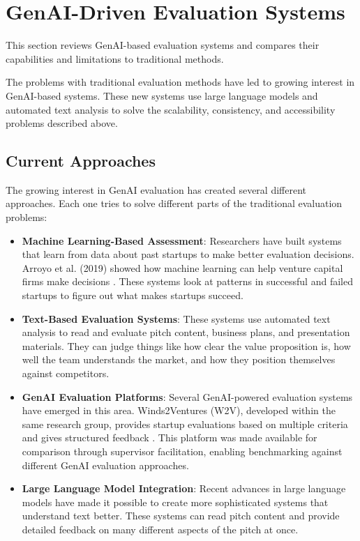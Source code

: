 \section{GenAI-Driven Evaluation Systems}
\label{sec:GenAI-systems}

This section reviews GenAI-based evaluation systems and compares their capabilities and limitations to traditional methods.

The problems with traditional evaluation methods have led to growing interest in GenAI-based systems. These new systems use large language models and automated text analysis to solve the scalability, consistency, and accessibility problems described above.

\subsection{Current Approaches}\label{subsec:current-approaches}
The growing interest in GenAI evaluation has created several different approaches. Each one tries to solve different parts of the traditional evaluation problems:

\begin{itemize}
    \item \textbf{Machine Learning-Based Assessment}: Researchers have built systems that learn from data about past startups to make better evaluation decisions. Arroyo et al. (2019) showed how machine learning can help venture capital firms make decisions \cite{Arroyo2019}. These systems look at patterns in successful and failed startups to figure out what makes startups succeed.

    \item \textbf{Text-Based Evaluation Systems}: These systems use automated text analysis to read and evaluate pitch content, business plans, and presentation materials. They can judge things like how clear the value proposition is, how well the team understands the market, and how they position themselves against competitors.

    \item \textbf{GenAI Evaluation Platforms}: Several GenAI-powered evaluation systems have emerged in this area. Winds2Ventures (W2V), developed within the same research group, provides startup evaluations based on multiple criteria and gives structured feedback \cite{w2v}. This platform was made available for comparison through supervisor facilitation, enabling benchmarking against different GenAI evaluation approaches.

    \item \textbf{Large Language Model Integration}: Recent advances in large language models have made it possible to create more sophisticated systems that understand text better. These systems can read pitch content and provide detailed feedback on many different aspects of the pitch at once.
\end{itemize}


